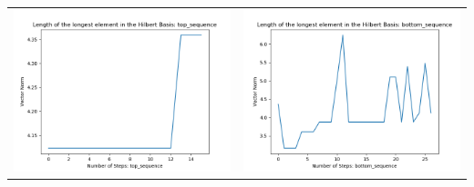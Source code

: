 \documentclass[10pt]{article}
\begin{document}
\begin{tabular}{c|c}
\begin{minipage}{.45\textwidth}
\includegraphics[width=\textwidth]{"DATA/4d/5 generators 2 bound I/top_sequence LENGTH"}
\end{minipage} &
\begin{minipage}{.45\textwidth}
\includegraphics[width=\textwidth]{"DATA/4d/5 generators 2 bound I bottomup/bottom_sequence LENGTH"}
\end{minipage}
\end{tabular}
\end{document}
